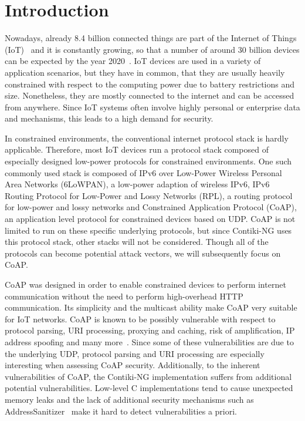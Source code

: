 \section{Introduction}
\label{section:introduction}


Nowadays, already 8.4 billion connected things are part of the Internet of Things (IoT)~\cite{IoTForecastGartner} and it is constantly growing, so that a number of around 30 billion devices can be expected by the year 2020~\cite{IoTForecastNordrum}. IoT devices are used in a variety of application scenarios, but they have in common, that they are usually heavily constrained with respect to the computing power due to battery restrictions and size. Nonetheless, they are mostly connected to the internet and can be accessed from anywhere. Since IoT systems often involve highly personal or enterprise data and mechanisms, this leads to a high demand for security.

In constrained environments, the conventional internet protocol stack is hardly applicable. Therefore, most IoT devices run a protocol stack composed of especially designed low-power protocols for constrained environments. One such commonly used stack is composed of IPv6 over Low-Power Wireless Personal Area Networks (6LoWPAN), a low-power adaption of wireless IPv6, IPv6 Routing Protocol for Low-Power and Lossy Networks (RPL), a routing protocol for low-power and lossy networks and Constrained Application Protocol (CoAP), an application level protocol for constrained devices based on UDP. CoAP is not limited to run on these specific underlying protocols, but since Contiki-NG uses this protocol stack, other stacks will not be considered. Though all of the protocols can become potential attack vectors, we will subsequently focus on CoAP.

CoAP was designed in order to enable constrained devices to perform internet communication without the need to perform high-overhead HTTP communication. Its simplicity and the multicast ability make CoAP very suitable for IoT networks.
CoAP is known to be possibly vulnerable with respect to protocol parsing, URI processing, proxying and caching, risk of amplification, IP address spoofing and many more~\cite{RFC7252}. Since some of these vulnerabilities are due to the underlying UDP, protocol parsing and URI processing are especially interesting when assessing CoAP security. Additionally, to the inherent vulnerabilities of CoAP, the Contiki-NG implementation suffers from additional potential vulnerabilities. Low-level C implementations tend to cause unexpected memory leaks and the lack of additional security mechanisms such as AddressSanitizer~\cite{addressSanitizer}  make it hard to detect vulnerabilities a priori.

